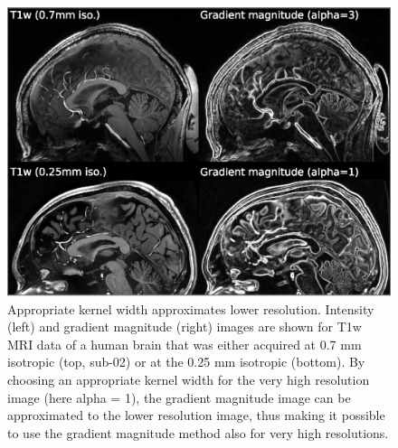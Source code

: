 \begin{figure}[htbp!]
\centering
\includegraphics[width=\textwidth]{figures/chapter_02_SI/supp_deriche_gradient_magnitude.eps}
\caption{Appropriate kernel width approximates lower resolution. Intensity (left) and gradient magnitude (right) images are shown for T1w MRI data of a human brain that was either acquired at 0.7 mm isotropic (top, sub-02) or at the 0.25 mm isotropic \parencite{Lusebrink2017, 250micron_data} (bottom). By choosing an appropriate kernel width for the very high resolution image (here alpha = 1), the gradient magnitude image can be approximated to the lower resolution image, thus making it possible to use the gradient magnitude method also for very high resolutions.}
\label{fig:S1_Fig}
\end{figure}

